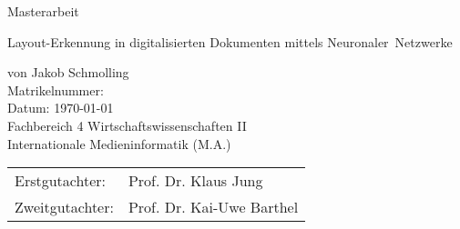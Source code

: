 \begin{titlepage}
    \vspace*{\baselineskip}
    \vspace*{0.167\textheight} 
    Masterarbeit\\
    \vspace{\baselineskip}
    \begin{minipage}{15cm}
    {\huge Layout-Erkennung in digitalisierten Dokumenten mittels Neuronaler~Netzwerke\par}
    \end{minipage}
    
    \vspace{\baselineskip}
    von Jakob Schmolling\\
    \vfill
    Matrikelnummer:\\
    \vspace{\baselineskip}
    Datum: \today \\
    \vspace{\baselineskip}
    Fachbereich 4 Wirtschaftswissenschaften II\\
    Internationale Medieninformatik (M.A.)\\
    \vspace{\baselineskip}
    \begin{tabular}{@{\hspace{0em}}ll}
    Erstgutachter: & Prof. Dr. Klaus Jung\\
    Zweitgutachter: & Prof. Dr. Kai-Uwe Barthel\\
    \end{tabular}
\end{titlepage}


